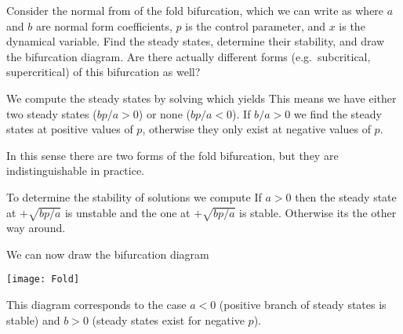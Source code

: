 Consider the normal from of the fold bifurcation, which we can write as 
where $a$ and $b$ are normal form coefficients, $p$ is the control parameter, and $x$ is the dynamical variable. Find the steady states, determine their stability, and draw the bifurcation diagram. Are there actually different forms (e.g.~subcritical, supercritical) of this bifurcation as well?

\solution
We compute the steady states by solving 
which yields 
This means we have either two steady states ($bp/a>0$) or none ($bp/a<0$). If $b/a>0$ we find the steady states at positive values of $p$, otherwise they only exist at negative values of $p$. 

In this sense there are two forms of the fold bifurcation, but they are indistinguishable in practice.

To determine the stability of solutions we compute
If $a>0$ then the steady state at $+\sqrt{bp/a}$ is unstable and the one at $+\sqrt{bp/a}$ is stable. Otherwise its the other way around. 

We can now draw the bifurcation diagram 
\begin{center}
\texttt{[image: Fold]}
\end{center}
This diagram corresponds to the case $a<0$ (positive branch of steady states is stable) and $b>0$ (steady states exist for negative $p$).
